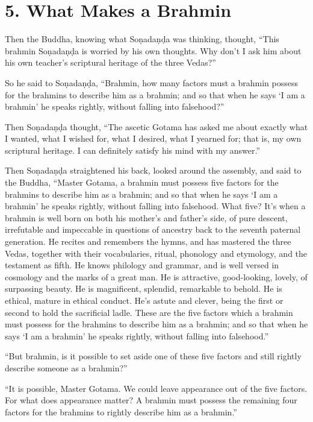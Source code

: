 \documentclass[12pt,openany]{book}%
\begin{document}
\section*{5. What Makes a Brahmin }

Then the Buddha, knowing what \textsanskrit{Soṇadaṇḍa} was thinking, thought, “This brahmin \textsanskrit{Soṇadaṇḍa} is worried by his own thoughts. Why don’t I ask him about his own teacher’s scriptural heritage of the three Vedas?” 

So he said to \textsanskrit{Soṇadaṇḍa}, “Brahmin, how many factors must a brahmin possess for the brahmins to describe him as a brahmin; and so that when he says ‘I am a brahmin’ he speaks rightly, without falling into falsehood?” 

Then \textsanskrit{Soṇadaṇḍa} thought, “The ascetic Gotama has asked me about exactly what I wanted, what I wished for, what I desired, what I yearned for; that is, my own scriptural heritage. I can definitely satisfy his mind with my answer.” 

Then \textsanskrit{Soṇadaṇḍa} straightened his back, looked around the assembly, and said to the Buddha, “Master Gotama, a brahmin must possess five factors for the brahmins to describe him as a brahmin; and so that when he says ‘I am a brahmin’ he speaks rightly, without falling into falsehood. What five? It’s when a brahmin is well born on both his mother’s and father’s side, of pure descent, irrefutable and impeccable in questions of ancestry back to the seventh paternal generation. He recites and remembers the hymns, and has mastered the three Vedas, together with their vocabularies, ritual, phonology and etymology, and the testament as fifth. He knows philology and grammar, and is well versed in cosmology and the marks of a great man. He is attractive, good-looking, lovely, of surpassing beauty. He is magnificent, splendid, remarkable to behold. He is ethical, mature in ethical conduct. He’s astute and clever, being the first or second to hold the sacrificial ladle. These are the five factors which a brahmin must possess for the brahmins to describe him as a brahmin; and so that when he says ‘I am a brahmin’ he speaks rightly, without falling into falsehood.” 

“But brahmin, is it possible to set aside one of these five factors and still rightly describe someone as a brahmin?” 

“It is possible, Master Gotama. We could leave appearance out of the five factors. For what does appearance matter? A brahmin must possess the remaining four factors for the brahmins to rightly describe him as a brahmin.” 
\end{document}
